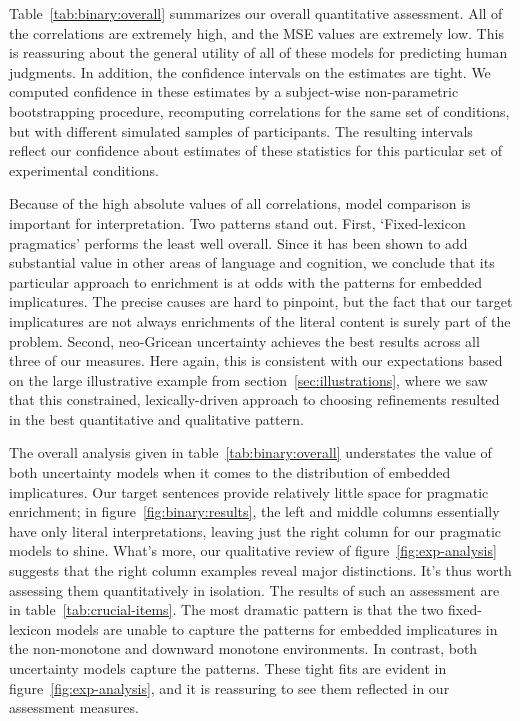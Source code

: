 \documentclass[leqno,12pt]{article}
\newcommand{\secref}[1]{section~\ref{#1}}
\newcommand{\figref}[1]{figure~\ref{#1}}
\newcommand{\Tabref}[1]{Table~\ref{#1}}
\newcommand{\tabref}[1]{table~\ref{#1}}
\begin{document}
{\Tabref{tab:binary:overall} summarizes our overall quantitative
assessment. All of the correlations are extremely high, and the MSE
values are extremely low. This is reassuring about the general utility
of all of these models for predicting human judgments.  In addition,
the confidence intervals on the estimates are tight. We computed
confidence in these estimates by a subject-wise non-parametric
bootstrapping procedure, recomputing correlations for the same set of
conditions, but with different simulated samples of participants. The
resulting intervals reflect our confidence about estimates of these
statistics for this particular set of experimental conditions.

Because of the high absolute values of all correlations, model comparison 
is important for interpretation. Two patterns stand out.  First,
`Fixed-lexicon pragmatics' performs the least well overall.  Since it
has been shown to add substantial value in other areas of language and
cognition, we conclude that its particular approach to enrichment is
at odds with the patterns for embedded implicatures.  The precise
causes are hard to pinpoint, but the fact that our target implicatures
are not always enrichments of the literal content is surely part of
the problem. Second, neo-Gricean uncertainty achieves the best results
across all three of our measures. Here again, this is consistent with
our expectations based on the large illustrative example from
\secref{sec:illustrations}, where we saw that this constrained,
lexically-driven approach to choosing refinements resulted in the best
quantitative and qualitative pattern.

The overall analysis given in \tabref{tab:binary:overall} understates the
value of both uncertainty models when it comes to the distribution of
embedded implicatures. Our target sentences provide relatively little
space for pragmatic enrichment; in \figref{fig:binary:results}, the left
and middle columns essentially have only literal interpretations,
leaving just the right column for our pragmatic models to
shine. What's more, our qualitative review of
\figref{fig:exp-analysis} suggests that the right column examples
reveal major distinctions. It's thus worth assessing them
quantitatively in isolation. The results of such an assessment are in
\tabref{tab:crucial-items}.  The most dramatic pattern is that the two
fixed-lexicon models are unable to capture the patterns for embedded
implicatures in the non-monotone and downward monotone
environments. In contrast, both uncertainty models capture the
patterns. These tight fits are evident in \figref{fig:exp-analysis},
and it is reassuring to see them reflected in our assessment measures.

}
\end{document}
